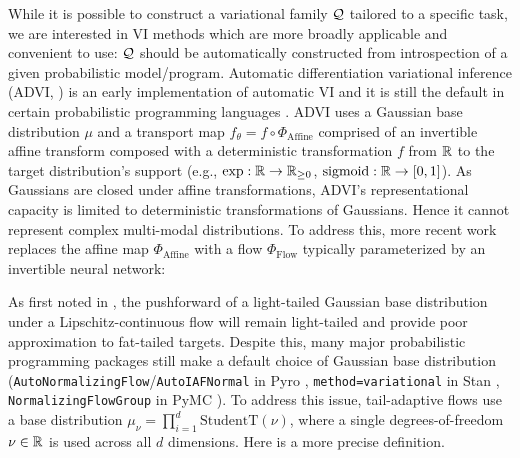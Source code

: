 \documentclass[../../thesis.tex]{subfiles}
\begin{document}
While it is possible to construct a variational family $\mathcal{Q}$ tailored to a specific task, we are interested in VI methods which are more broadly applicable and convenient to use: $\mathcal{Q}$ should be automatically constructed from introspection of a given probabilistic model/program.
Automatic differentiation variational inference (ADVI, \citet{kucukelbir2017automatic}) is an early implementation of automatic VI and it is still the default in certain probabilistic programming languages \citep{carpenter2017stan}.
ADVI uses a Gaussian base distribution $\mu$ and a transport map $f_\theta = f \circ \Phi_\text{Affine}$ comprised of an invertible affine transform composed with a deterministic transformation $f$ from $\mathbb{R}$ to the target distribution's support (e.g., $\exp : \mathbb{R} \to \mathbb{R}_{\geq 0}$, $\text{sigmoid} : \mathbb{R} \to [0,1]$).
As Gaussians are closed under affine transformations, ADVI's representational capacity is limited to deterministic transformations of Gaussians. Hence it cannot represent complex multi-modal distributions.
To address this, more recent work \citep{kingma2016improved,webb2019improving} replaces the affine map $\Phi_\text{Affine}$ with a flow $\Phi_{\text{Flow}}$ typically parameterized by an invertible neural network:


As first noted in \citet{jaini2020tails}, the pushforward of a light-tailed Gaussian base distribution under a Lipschitz-continuous flow will remain light-tailed and provide poor approximation to fat-tailed targets.
Despite this,
many major probabilistic programming packages still make a default choice of Gaussian base distribution (\texttt{AutoNormalizingFlow}/\texttt{AutoIAFNormal} in Pyro \citep{bingham2019pyro}, \texttt{method=variational} in Stan \citep{carpenter2017stan}, \texttt{NormalizingFlowGroup} in PyMC \citep{patil2010pymc}).
To address this issue, tail-adaptive flows \citep{jaini2020tails} use a
base distribution $\mu_\nu = \prod_{i=1}^d \text{StudentT}(\nu)$,
where a single degrees-of-freedom $\nu \in \mathbb{R}$ is used across all $d$ dimensions. Here is a more precise definition.
\end{document}
